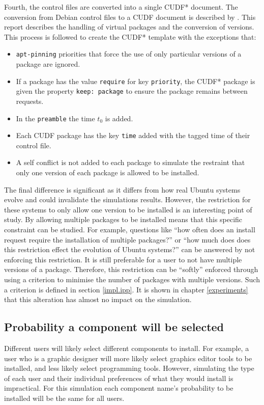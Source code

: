 Fourth, the control files are converted into a single CUDF* document.
The conversion from Debian control files to a CUDF document is described by \cite{abatetrenen2010}.
This report describes the handling of virtual packages and the conversion of versions. 
This process is followed to create the CUDF* template with the exceptions that:
\begin{itemize}
  \item \texttt{apt-pinning} priorities that force the use of only particular versions of a package are ignored.
  \item If a package has the value \texttt{require} for key \texttt{priority}, the CUDF* package is given the property \texttt{keep: package} to ensure the package remains between requests.
  \item In the \texttt{preamble} the time $t_0$ is added.
  \item Each CUDF package has the key \texttt{time} added with the tagged time of their control file.
  \item A self conflict is not added to each package to simulate the restraint that only one version of each package is allowed to be installed.
\end{itemize} 
The final difference is significant as it differs from how real Ubuntu systems evolve and could invalidate the simulations results.
However, the restriction for these systems to only allow one version to be installed is an interesting point of study.
By allowing multiple packages to be installed means that this specific constraint can be studied.
For example, questions like ``how often does an install request require the installation of multiple packages?'' 
or ``how much does does this restriction effect the evolution of Ubuntu systems?'' can be answered by not enforcing this restriction.
It is still preferable for a user to not have multiple versions of a package.
Therefore, this restriction can be ``softly'' enforced through using a criterion to minimise the number of packages with multiple versions.
Such a criterion is defined in section \ref{impl.ipp}.
It is shown in chapter \ref{experiments} that this alteration has almost no impact on the simulation.

\subsection{Probability a component will be selected}
Different users will likely select different components to install.
For example, a user who is a graphic designer will more likely select graphics editor tools to be installed, and less likely select programming tools.
However, simulating the type of each user and their individual preferences of what they would install is impractical.
For this simulation each component name's probability to be installed will be the same for all users.

